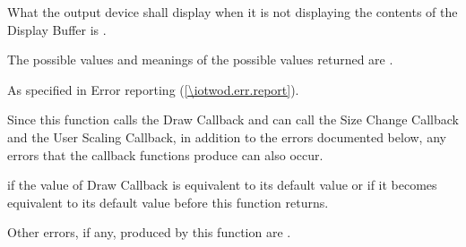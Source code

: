 \begin{itemdescr}
\pnum
What the output device shall display when it is not displaying the contents of the Display Buffer is \unspecnorm.

\pnum
\returns
The possible values and meanings of the possible values returned are .

\pnum
\throws
As specified in Error reporting (\ref{\iotwod.err.report}).

\pnum
\remarks
Since this function calls the Draw Callback and can call the Size Change Callback and the User Scaling Callback, in addition to the errors documented below, any errors that the callback functions produce can also occur.

\pnum
\errors
\pnum
{} if the value of Draw Callback is equivalent to its default value or if it becomes equivalent to its default value before this function returns.

\pnum
Other errors, if any, produced by this function are .
\end{itemdescr}


